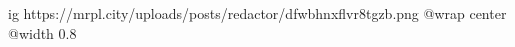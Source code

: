  
 
 
 
 

\ifcmt
  ig https://mrpl.city/uploads/posts/redactor/dfwbhnxflvr8tgzb.png
  @wrap center
  @width 0.8
\fi
